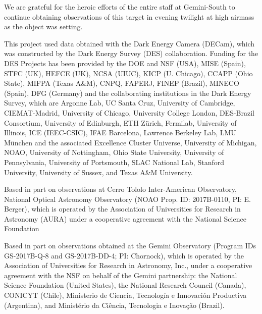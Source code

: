 We are grateful for the heroic efforts of the entire staff at Gemini-South to continue obtaining observations of this target in evening twilight at high airmass as the object was setting.

This project used data obtained with the Dark Energy Camera (DECam), which was constructed by the Dark Energy Survey (DES) collaboration. Funding for the DES Projects has been provided by the DOE and NSF (USA), MISE (Spain), STFC (UK), HEFCE (UK), NCSA (UIUC), KICP (U. Chicago), CCAPP (Ohio State), MIFPA (Texas A\&M), CNPQ, FAPERJ, FINEP (Brazil), MINECO (Spain), DFG (Germany) and the collaborating institutions in the Dark Energy Survey, which are Argonne Lab, UC Santa Cruz, University of Cambridge, CIEMAT-Madrid, University of Chicago, University College London, DES-Brazil Consortium, University of Edinburgh, ETH Z{\"u}rich, Fermilab, University of Illinois, ICE (IEEC-CSIC), IFAE Barcelona, Lawrence Berkeley Lab, LMU M{\"u}nchen and the associated Excellence Cluster Universe, University of Michigan, NOAO, University of Nottingham, Ohio State University, University of Pennsylvania, University of Portsmouth, SLAC National Lab, Stanford University, University of Sussex, and Texas A\&M University.

Based in part on observations at Cerro Tololo Inter-American Observatory, National Optical Astronomy Observatory (NOAO Prop. ID: 2017B-0110, PI: E. Berger), which is operated by the Association of Universities for Research in Astronomy (AURA) under a cooperative agreement with the National Science Foundation

Based in part on observations obtained at the Gemini Observatory (Program IDs GS-2017B-Q-8 and GS-2017B-DD-4; PI: Chornock), which is operated by the Association of Universities for Research in Astronomy, Inc., under a cooperative agreement with the NSF on behalf of the Gemini partnership: the National Science Foundation (United States), the National Research Council (Canada), CONICYT (Chile), Ministerio de Ciencia, Tecnolog\'{i}a e Innovaci\'{o}n Productiva (Argentina), and Minist\'{e}rio da Ci\^{e}ncia, Tecnologia e Inova\c{c}\~{a}o (Brazil).
